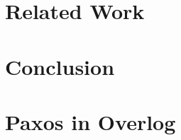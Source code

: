 \documentclass{article}
\begin{document}
\section{Related Work}
\label{related-work}

\section{Conclusion}
\label{conclusion}



\appendix
\section{Paxos in Overlog}
\end{document}
